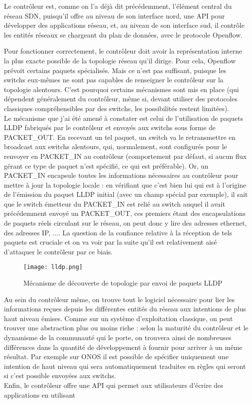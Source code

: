 Le contrôleur est, comme on l'a déjà dit précédemment, l'élément central du réseau SDN, puisqu'il offre au niveau de son interface nord, une API pour développer des applications réseau, et, au niveau de son interface sud, il contrôle les entités réseaux se chargeant du plan de données, avec le protocole Openflow.

Pour fonctionner correctement, le contrôleur doit avoir la représentation interne la plus exacte possible de la topologie réseau qu'il dirige. Pour cela, Openflow prévoit certains paquets spécialisés. Mais ce n'est pas suffisant, puisque les switchs eux-mêmes ne sont pas capables de renseigner le contrôleur sur la topologie alentours. C'est pourquoi certains mécanismes sont mis en place (qui dépendent généralement du contrôleur, même si, devant utiliser des protocoles classiques compréhensibles par des switchs, les possibilités restent limitées).\\
Le mécanisme que j'ai été amené à constater est celui de l'utilisation de paquets LLDP fabriqués par le contrôleur et envoyés aux switchs sous forme de PACKET\_OUT. En recevant un tel paquet, un switch va le retransmettre en broadcast aux switchs alentours, qui, normalement, sont configurés pour le renvoyer en PACKET\_IN au contrôleur (comportement par défaut, si aucun flux gérant ce type de paquet n'est spécifié, ce qui est préférable). Or, un PACKET\_IN encapsule toutes les informations nécessaires au contrôleur pour mettre à jour la topologie locale : en vérifiant que c'est bien lui qui est à l'origine de l'émission du paquet LLDP initial (avec un champ spécial par exemple), il sait que le switch émetteur du PACKET\_IN est relié au switch auquel il avait précédemment envoyé un PACKET\_OUT, ces premiers étant des encapsulations de paquets réels circulant sur le réseau, on peut donc y lire des adresses ethernet, des adresses IP, .... La question de la confiance relative à la réception de tels paquets est cruciale et on va voir par la suite qu'il est relativement aisé d'attaquer le contrôleur par ce biais.\\

\begin{figure}[h]
  	\centering
  	\texttt{[image: lldp.png]}
  	\caption{Mécanisme de découverte de topologie par envoi de paquets LLDP}
\end{figure}

Au sein du contrôleur même, on trouve tout le logiciel nécessaire pour lier les informations reçues depuis les différentes entités du réseau aux intentions de plus haut niveau émises. Comme sur un système d'exploitation classique, on peut trouver une abstraction plus ou moins riche : selon la maturité du contrôleur et le dynamisme de la communauté qui le porte, on trouvera ainsi de nombreuses différences dans la quantité de développement à fournir pour arriver à un même résultat. Par exemple sur ONOS il est possible de spécifier uniquement une intention de haut niveau qui sera automatiquement traduites en règles qui seront si c'est possible envoyées aux switchs.\\

Enfin, le contrôleur offre une API qui permet aux utilisateurs d'écrire des applications en utilisant 